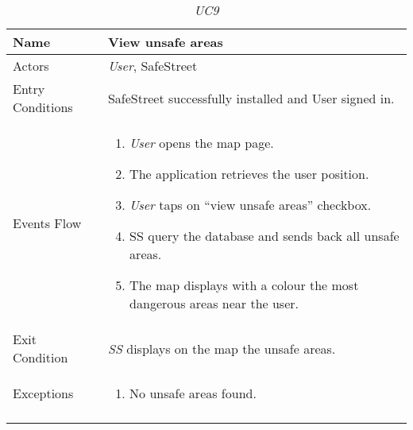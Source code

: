 \documentclass[../../../RASD.tex]{subfiles}
\begin{document}
    \begin{center}
        \begin{longtable}{| p{.35\linewidth} | p{.65\linewidth} |}
            \hline
            \textbf{Name} & \textbf{View unsafe areas}\\ \hline
            Actors & \textit{User}, SafeStreet\\ \hline
            Entry Conditions & SafeStreet successfully installed and User signed in.\\ \hline
            Events Flow &
            \begin{enumerate}
                \item \textit{User} opens the map page.
                \item  The application retrieves the user position.
                \item \textit{User} taps on “view unsafe areas” checkbox.
                \item  SS query the database and sends back all unsafe areas.
                \item The map displays with a colour the most dangerous areas near the user.
            \end{enumerate}
            \\ \hline
            Exit Condition & \textit{SS} displays on the map the unsafe areas.\\ \hline
            Exceptions &
            \begin{enumerate}
                \item No unsafe areas found.
            \end{enumerate}
            \\
            \hline
            \caption{\textit{UC9}}
        \end{longtable}
    \end{center}
    \newpage
\end{document}
